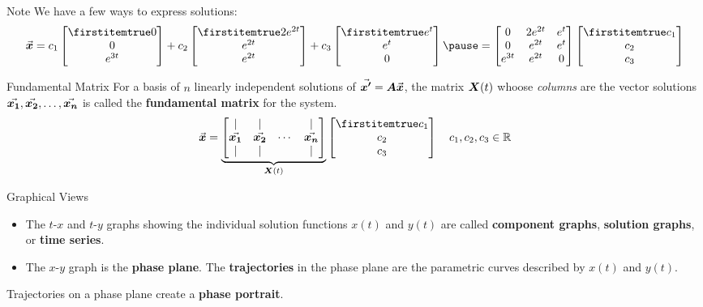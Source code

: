 \documentclass{beamer}
\begin{document}
\begin{frame}
\begin{block}{Note}
We have a few ways to express solutions:
\begin{equation*}
\vect{x}=
c_1\bvector{0,0,e^{3t}}+
c_2\bvector{2e^{2t},e^{2t},e^{2t}}+
c_3\bvector{e^t,e^t,0}\pause
=
\begin{bmatrix}
0 & 2e^{2t} & e^t \\
0 & e^{2t} & e^t \\
e^{3t} & e^{2t} & 0 \\
\end{bmatrix}
\bvector{c_1,c_2,c_3}
\end{equation*}
\end{block}\pause
\begin{block}{Fundamental Matrix}
For a basis of $n$ linearly independent solutions of ${\vec{\boldsymbol{x^\prime}}}=\boldsymbol{A}{\vec{\boldsymbol{x}}}$, the matrix $\boldsymbol{X}(t)$ whoose \emph{columns} are the vector solutions ${\vec{\boldsymbol{x_1}}},{\vec{\boldsymbol{x_2}}},\ldots,{\vec{\boldsymbol{x_n}}}$ is called the \textbf{fundamental matrix} for the system.
\begin{equation*}
\vect{x}=
\underbrace{\begin{bmatrix}
\mid & \mid & & \mid \\
\vect{x_1} & \vect{x_2} & \cdots & \vect {x_n} \\
\mid & \mid & & \mid \\
\end{bmatrix}}_{\mat{X}(t)}
\bvector{c_1,c_2,c_3}
\quad c_1,c_2,c_3\in\R
\end{equation*}
\end{block}
\end{frame}

\begin{frame}
\begin{block}{Graphical Views}
\begin{itemize}
\item The $t$-$x$ and $t$-$y$ graphs showing the individual solution functions $x(t)$ and $y(t)$ are called \textbf{component graphs}, \textbf{solution graphs}, or \textbf{time series}.
\item The $x$-$y$ graph is the \textbf{phase plane}. The \textbf{trajectories} in the phase plane are the parametric curves described by $x(t)$ and $y(t)$.
\end{itemize}
Trajectories on a phase plane create a \textbf{phase portrait}.
\end{block}
\end{frame}
\end{document}
